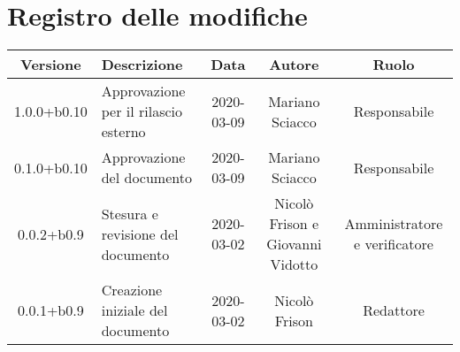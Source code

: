 \section*{Registro delle modifiche}

\begin{center}
	\begin{longtable}{|c|p{3cm}|c|c|c|}
	\hline
	\rowcolor{lighter-grayer}
	\textbf{Versione} & \textbf{Descrizione} & \textbf{Data} & \textbf{Autore} & \textbf{Ruolo} \\
	\hline
	\endfirsthead

	1.0.0+b0.10 & Approvazione per il rilascio esterno & 2020-03-09 & Mariano Sciacco & Responsabile \\
	\hline
	0.1.0+b0.10 & Approvazione del documento & 2020-03-09 & Mariano Sciacco & Responsabile \\
	\hline
	0.0.2+b0.9 & Stesura e revisione del documento & 2020-03-02 & Nicolò Frison e Giovanni Vidotto & Amministratore e verificatore \\
	\hline
	0.0.1+b0.9 & Creazione iniziale del documento & 2020-03-02 & Nicolò Frison & Redattore \\
	\hline

	\end{longtable}
\end{center}